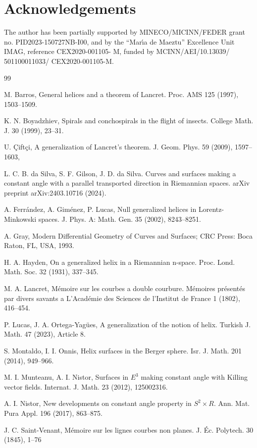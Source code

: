 \documentclass[a4paper,12pt]{amsart}
\theoremstyle{definition}
\begin{document}
\section*{Acknowledgements}
The author  has been partially supported by MINECO/MICINN/FEDER grant no. PID2023-150727NB-I00,  and by the ``Mar\'{\i}a de Maeztu'' Excellence Unit IMAG, reference CEX2020-001105- M, funded by MCINN/AEI/10.13039/ 501100011033/ CEX2020-001105-M.
\begin{thebibliography}{99}
 
  M. Barros,  General helices and a theorem of Lancret. Proc. AMS 125 (1997), 1503--1509.
 
  K. N. Boyadzhiev, Spirals and conchospirals in the flight of insects.
College Math. J.   30 (1999), 23--31.

   U. \c{C}ift\c{c}i, A generalization of Lancret's theorem. J. Geom. Phys. 59 (2009),  1597--1603,


 L. C. B. da Silva, S. F.  Gilson, J. D. da Silva. Curves and surfaces making a constant angle with a parallel transported direction in Riemannian spaces. arXiv preprint arXiv:2403.10716 (2024).

 A. Ferr\'andez, A. Gim\'enez, P. Lucas, Null generalized helices in Lorentz-Minkowski spaces. J. Phys. A: Math. Gen. 35 (2002), 8243--8251.

 A. Gray,   Modern Differential Geometry of Curves and Surfaces; CRC Press: Boca Raton, FL, USA, 1993. 

 H. A. Hayden, On a generalized helix in a Riemannian n-space. Proc. Lond. Math. Soc. 32 (1931), 337--345.

 M. A. Lancret, M\'emoire sur les courbes a double courbure. M\'emoires pr\'esent\'es par divers savants a L'Acad\'emie des Sciences de l'Institut de France 1 (1802), 416--454.

  P. Lucas, J. A. Ortega-Yag\"{u}es,  A generalization of the notion of helix. Turkish J. Math.  47 (2023),  Article 8.
 
  S. Montaldo,  I. I. Onnis,   Helix surfaces in the Berger sphere. Isr. J. Math. 201 (2014), 949--966. 


 M. I. Munteanu, A. I. Nistor,  Surfaces in $E^3$ making constant angle with Killing vector fields. Internat. J. Math. 23 (2012), 125002316.

 A. I. Nistor,   New developments on constant angle property in  $S^2\times R$. Ann. Mat. Pura Appl. 196 (2017), 863--875.

 J. C. Saint-Venant,  
M\'emoire sur les lignes courbes non planes. J. \'{E}c. Polytech.   30 (1845), 1--76
 \end{thebibliography}
\end{document}
